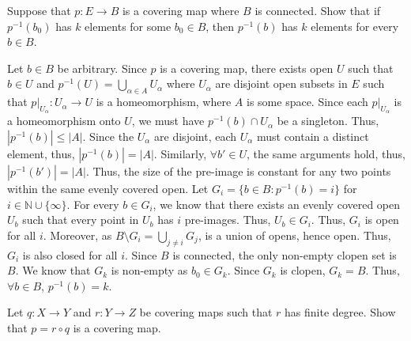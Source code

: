 \documentclass[12pt]{article}
\begin{document}
\begin{problab}{5}
Suppose that \( p : E \to B \) is a covering map where \( B \) is connected. Show that if \( p^{-1}(b_0) \) has \( k \) elements for some \( b_0 \in B \), then \( p^{-1}(b) \) has \( k \) elements for every \( b \in B \).
\end{problab}
\begin{solu}
    Let $b \in B$ be arbitrary. Since $p$ is a covering map, there exists open $U$ such that $b \in U$ and $p^{-1}(U) = \bigcup_{\alpha \in A} U_\alpha$ where $U_\alpha$ are disjoint open subsets in $E$ such that $p|_{U_\alpha}: U_\alpha \to U$ is a homeomorphism, where $A$ is some space. Since each $p|_{U_\alpha}$ is a homeomorphism onto $U$, we must have $p^{-1}(b) \cap U_\alpha$ be a singleton. Thus, $|p^{-1}(b)| \leq |A|$. Since the $U_\alpha$ are disjoint, each $U_\alpha$ must contain a distinct element, thus, $|p^{-1}(b)| = |A|$. Similarly, $\forall b' \in U$, the same arguments hold, thus, $|p^{-1}(b')| = |A|$. Thus, the size of the pre-image is constant for any two points within the same evenly covered open. \bbni
    Let $G_i = \{b \in B : p^{-1}(b) = i\}$ for $i \in \mathbb{N} \cup \{\infty\}$. For every $b \in G_i$, we know that there exists an evenly covered open $U_b$ such that every point in $U_b$ has $i$ pre-images. Thus, $U_b \in G_i$. Thus, $G_i$ is open for all $i$. Moreover, as $B \setminus G_i = \bigcup_{j \neq i} G_j$, is a union of opens, hence open. Thus, $G_i$ is also closed for all $i$. \bbni
    Since $B$ is connected, the only non-empty clopen set is $B$. We know that $G_k$ is non-empty as $b_0 \in G_k$. Since $G_k$ is clopen, $G_k = B$. Thus, $\forall b \in B$, $p^{-1}(b) = k$.
\end{solu}
\newpage

\begin{problab}{6}
Let \( q : X \to Y \) and \( r : Y \to Z \) be covering maps such that \( r \) has finite degree. Show that \( p = r \circ q \) is a covering map.
\end{problab}
\begin{solu}

\end{solu}
\end{document}
